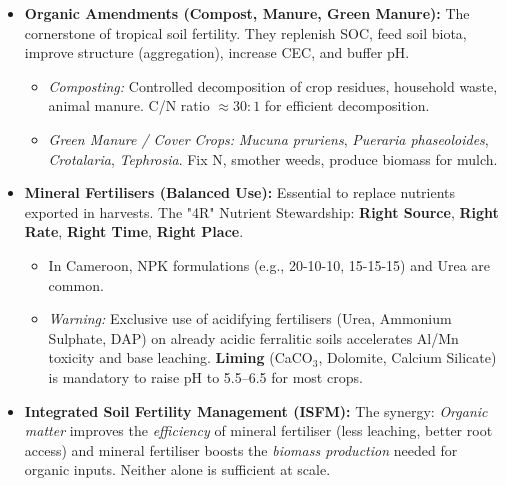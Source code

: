 \documentclass[11pt]{article}
\begin{document}
\begin{itemize}
    \item \textbf{Organic Amendments (Compost, Manure, Green Manure):} The cornerstone of tropical soil fertility. They replenish SOC, feed soil biota, improve structure (aggregation), increase CEC, and buffer pH.
    \begin{itemize}
        \item \emph{Composting:} Controlled decomposition of crop residues, household waste, animal manure. C/N ratio $\approx 30:1$ for efficient decomposition.
        \item \emph{Green Manure / Cover Crops:} \emph{Mucuna pruriens}, \emph{Pueraria phaseoloides}, \emph{Crotalaria}, \emph{Tephrosia}. Fix N, smother weeds, produce biomass for mulch.
    \end{itemize}
    \item \textbf{Mineral Fertilisers (Balanced Use):} Essential to replace nutrients exported in harvests. The "4R" Nutrient Stewardship: \textbf{Right Source}, \textbf{Right Rate}, \textbf{Right Time}, \textbf{Right Place}.
    \begin{itemize}
        \item In Cameroon, NPK formulations (e.g., 20-10-10, 15-15-15) and Urea are common.
        \item \emph{Warning:} Exclusive use of acidifying fertilisers (Urea, Ammonium Sulphate, DAP) on already acidic ferralitic soils accelerates Al/Mn toxicity and base leaching. \textbf{Liming} (CaCO$_3$, Dolomite, Calcium Silicate) is mandatory to raise pH to 5.5–6.5 for most crops.
    \end{itemize}
    \item \textbf{Integrated Soil Fertility Management (ISFM):} The synergy: \emph{Organic matter} improves the \emph{efficiency} of mineral fertiliser (less leaching, better root access) and mineral fertiliser boosts the \emph{biomass production} needed for organic inputs. Neither alone is sufficient at scale.
\end{itemize}
\end{document}
